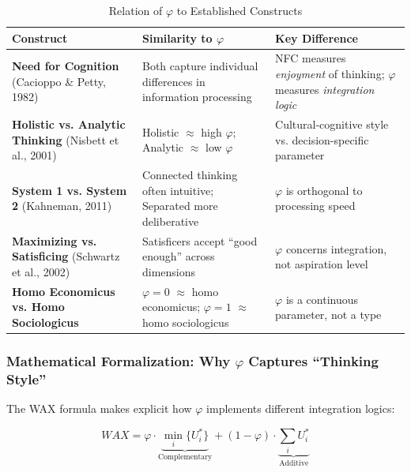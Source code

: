 \begin{table}[htbp]
\centering
\caption{Relation of $\varphi$ to Established Constructs}
\label{tab:phi-constructs}
\begin{tabular}{p{3.5cm}p{4cm}p{5cm}}
\toprule
\textbf{Construct} & \textbf{Similarity to $\varphi$} & \textbf{Key Difference} \\
\midrule
\textbf{Need for Cognition}
\newline (Cacioppo \& Petty, 1982) 
& Both capture individual differences in information processing 
& NFC measures \textit{enjoyment} of thinking; $\varphi$ measures \textit{integration logic} \\[8pt]

\textbf{Holistic vs. Analytic Thinking}
\newline (Nisbett et al., 2001)
& Holistic $\approx$ high $\varphi$; Analytic $\approx$ low $\varphi$
& Cultural-cognitive style vs. decision-specific parameter \\[8pt]

\textbf{System 1 vs. System 2}
\newline (Kahneman, 2011)
& Connected thinking often intuitive; Separated more deliberative
& $\varphi$ is orthogonal to processing speed \\[8pt]

\textbf{Maximizing vs. Satisficing}
\newline (Schwartz et al., 2002)
& Satisficers accept ``good enough'' across dimensions
& $\varphi$ concerns integration, not aspiration level \\[8pt]

\textbf{Homo Economicus vs. Homo Sociologicus}
& $\varphi=0$ $\approx$ homo economicus; $\varphi=1$ $\approx$ homo sociologicus
& $\varphi$ is a continuous parameter, not a type \\
\bottomrule
\end{tabular}
\end{table}

\subsubsection{Mathematical Formalization: Why $\varphi$ Captures ``Thinking Style''}

The WAX formula makes explicit how $\varphi$ implements different integration logics:

\begin{equation}
WAX = \varphi \cdot \underbrace{\min_i\{U_i^*\}}_{\text{Complementary}} + (1-\varphi) \cdot \underbrace{\sum_i U_i^*}_{\text{Additive}}
\end{equation}

